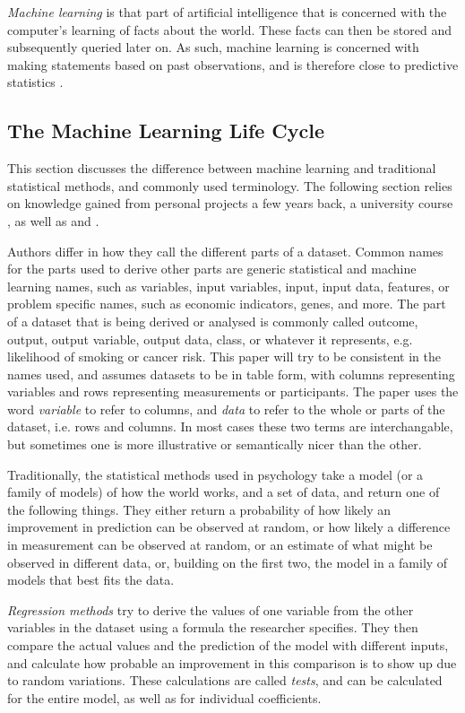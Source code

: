 \documentclass[a4paper,man,12pt,apacite,floatsintext,draftfirst]{apa6} %
\begin{document}
\emph{Machine learning} is that part of artificial intelligence that
is concerned with the computer's learning of facts about the world.
These facts can then be stored and subsequently queried later on.
As such, machine learning is concerned with making statements based
on past observations, and is therefore close to predictive statistics
\cite{wpML}.

\subsection{The Machine Learning Life Cycle}
This section discusses the difference between machine learning and traditional
statistical methods, and commonly used terminology.
The following section relies on knowledge gained from personal projects a few
years back, a university course \cite{psymeth}, as well as 
and .

Authors differ in how they call the different parts of a dataset.
Common names for the parts used to derive other parts are generic statistical
and machine learning names, such as variables, input variables, input, input data, features, or
problem specific names, such as economic indicators, genes, and more.
The part of a dataset that is being derived or analysed is commonly called outcome,
output, output variable, output data, class, or whatever it represents, e.g. likelihood of smoking or cancer risk.
This paper will try to be consistent in the names used, and assumes datasets
to be in table form, with columns representing variables and rows representing
measurements or participants.
The paper uses the word \emph{variable} to refer to columns, and \emph{data}
to refer to the whole or parts of the dataset, i.e. rows and columns.
In most cases these two terms are interchangable, but sometimes one is more
illustrative or semantically nicer than the other.

Traditionally, the statistical methods used in psychology
take a model (or a family of models) of how the world works, and a set of data, and return one of
the following things.
They either return a probability of how likely an improvement in prediction
can be observed at random, or how likely a difference in measurement can be
observed at random, or an estimate of what might be observed in different data,
or, building on the first two, the model in a family of models that best fits the data.

\emph{Regression methods} try to derive the values of
one variable from the other variables in the dataset using a formula the
researcher specifies.
They then compare the actual values and the prediction of the model with
different inputs, and calculate how probable an improvement in this
comparison is to show up due to random variations.
These calculations are called \emph{tests}, and can be calculated for the
entire model, as well as for individual coefficients. \cite{wpRA}
\end{document}
